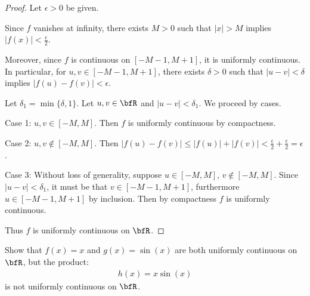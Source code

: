 \documentclass[11pt,twoside,openany]{memoir}
\begin{document}
        \begin{proof}
            Let $\epsilon > 0$ be given. \nl
            
            Since $f$ vanishes at infinity, there exists $M > 0$ such that $|x| > M$ implies $|f(x)| < \frac{\epsilon}{2}$. \nl
            
            Moreover, since $f$ is continuous on $[-M-1,M+1]$, it is uniformly continuous. In particular, for $u,v \in [-M-1,M +1]$, there exists $\delta > 0$ such that $|u-v| < \delta$ implies $|f(u) - f(v)| < \epsilon$. \nl
            
            Let $\delta_1 = \min\{\delta,1\}$. Let $u,v \in \bfR$ and $|u-v| < \delta_1$. We proceed by cases. \nl
            
            Case 1: $u,v \in [-M,M]$. Then $f$ is uniformly continuous by compactness. \nl
            
            Case 2: $u,v \not\in [-M,M]$. Then $|f(u)-f(v)| \leq |f(u)| + |f(v)| < \frac{\epsilon}{2} + \frac{\epsilon}{2} = \epsilon$. \nl
            
            Case 3: Without loss of generality, suppose $u \in [-M,M]$, $v \not\in [-M,M]$. Since $|u-v| < \delta_1$, it must be that $v \in [-M-1,M+1]$, furthermore $u\in[-M-1,M+1]$ by inclusion. Then by compactness $f$ is uniformly continuous. \nl
            
            Thus $f$ is uniformly continuous on $\bfR$.
        \end{proof}
    \begin{exercise}
        Show that $f(x) = x$ and $g(x) = \sin(x)$ are both uniformly continuous on $\bfR$, but the product:
            \begin{equation*}
            \begin{split}
                h(x) = x \sin(x)
            \end{split}
            \end{equation*}
        is not uniformly continuous on $\bfR$.
    \end{exercise}
\end{document}
